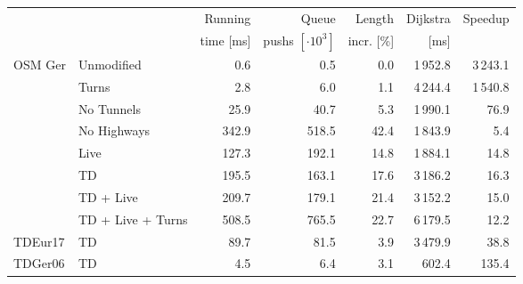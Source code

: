 \begin{tabular}{llrrrrr}
\toprule
 & &   Running &                Queue &     Length & Dijkstra & Speedup \\ & & time [ms] & pushs $[\cdot 10^3]$ & incr. [\%] &     [ms] &         \\
\midrule
OSM Ger & Unmodified &              0.6 &              0.5 &       0.0 &                    1\,952.8 &   3\,243.1 \\
        & Turns &              2.8 &              6.0 &       1.1 &                    4\,244.4 &   1\,540.8 \\
        & No Tunnels &             25.9 &             40.7 &       5.3 &                    1\,990.1 &     76.9 \\
        & No Highways &            342.9 &            518.5 &      42.4 &                    1\,843.9 &      5.4 \\
        & Live &            127.3 &            192.1 &      14.8 &                    1\,884.1 &     14.8 \\
        & TD &            195.5 &            163.1 &      17.6 &                    3\,186.2 &     16.3 \\
        & TD + Live &            209.7 &            179.1 &      21.4 &                    3\,152.2 &     15.0 \\
        & TD + Live + Turns &            508.5 &            765.5 &      22.7 &                    6\,179.5 &     12.2 \\
\addlinespace
TDEur17 & TD &             89.7 &             81.5 &       3.9 &                    3\,479.9 &     38.8 \\
TDGer06 & TD &              4.5 &              6.4 &       3.1 &                     602.4 &    135.4 \\
\bottomrule
\end{tabular}

